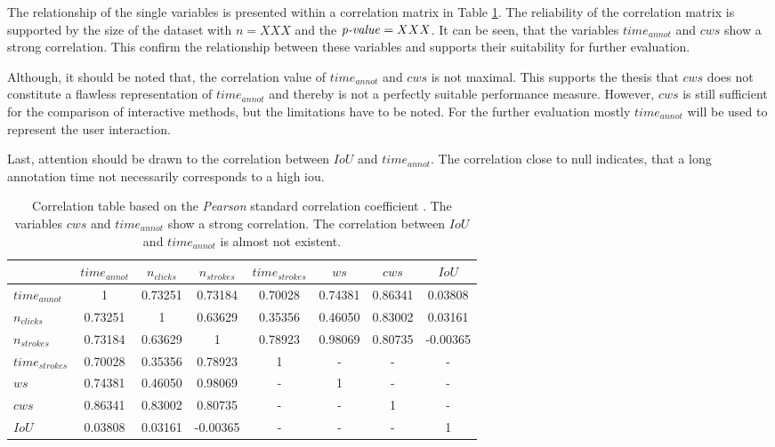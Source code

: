 The relationship of the single variables is presented within a correlation matrix in Table \ref{tab:ch5:correlation-matrix}.
The reliability of the correlation matrix is supported by the size of the dataset with $n=XXX$ and the $\textnormal{\textit{p-value}} = XXX$. %
It can be seen, that the variables $time_{annot}$ and $cws$ show a strong correlation.
This confirm the relationship between these variables and supports their suitability for further evaluation.

Although, it should be noted that, the correlation value of $time_{annot}$ and $cws$ is not maximal.
This supports the thesis that $cws$ does not constitute a flawless representation of $time_{annot}$ and thereby is not a perfectly suitable performance measure.
However, $cws$ is still sufficient for the comparison of interactive methods, but the limitations have to be noted.
For the further evaluation mostly $time_{annot}$ will be used to represent the user interaction.

Last, attention should be drawn to the correlation between $IoU$ and $time_{annot}$.
The correlation close to null indicates, that a long annotation time not necessarily corresponds to a high \gls{iou}.

\begin{table}[h!]
	\centering
	\begin{tabular}{l|c c c c c c c}
		\toprule 		
							& $time_{annot}$ & $n_{clicks}$ & $n_{strokes}$ & $time_{strokes}$ & $ws$ 	 & $cws$   & $IoU$ \\
		\midrule
		$time_{annot}$		& 1 			 & 0.73251 		&  0.73184 		& 0.70028 		   & 0.74381 & 0.86341 &  0.03808 \\ 
		$n_{clicks}$		& 0.73251		 & 1 			&  0.63629 		& 0.35356 		   & 0.46050 & 0.83002 &  0.03161 \\ 
		$n_{strokes}$ 		& 0.73184 		 & 0.63629 		&  1 			& 0.78923		   & 0.98069 & 0.80735 & -0.00365 \\ 	
		$time_{strokes}$ 	& 0.70028 		 & 0.35356	    &  0.78923	    & 1 			   & - & - & - \\ 
		$ws$				& 0.74381 		 & 0.46050 		&  0.98069		& - & 1 & - & - \\ 
		$cws$		  		& 0.86341 		 & 0.83002 		&  0.80735	    & - & - & 1 & - \\ 
		$IoU$    			& 0.03808 		 & 0.03161		& -0.00365		& - & - & - & 1 \\ 								
		\bottomrule
	\end{tabular}
	\caption[Correlation table]{
		Correlation table based on the \textit{Pearson} standard correlation coefficient \cite{Kirch08-CorrPearson}.
		The variables $cws$ and $time_{annot}$ show a strong correlation. 
		The correlation between $IoU$ and $time_{annot}$ is almost not existent.
	}\label{tab:ch5:correlation-matrix}
\end{table}

